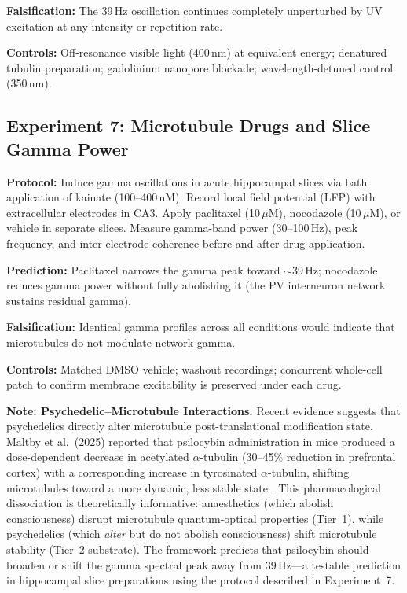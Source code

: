 \documentclass[10pt, a4paper, twocolumn]{article}
\begin{document}
\textbf{Falsification:} The 39\,Hz oscillation continues completely
unperturbed by UV excitation at any intensity or repetition rate.

\textbf{Controls:} Off-resonance visible light (400\,nm) at equivalent
energy; denatured tubulin preparation; gadolinium nanopore blockade;
wavelength-detuned control (350\,nm).

\subsection{Experiment 7: Microtubule Drugs and Slice Gamma Power}

\textbf{Protocol:} Induce gamma oscillations in acute hippocampal
slices via bath application of kainate (100--400\,nM). Record local
field potential (LFP) with extracellular electrodes in CA3. Apply
paclitaxel (10\,$\mu$M), nocodazole (10\,$\mu$M), or vehicle in
separate slices. Measure gamma-band power (30--100\,Hz), peak
frequency, and inter-electrode coherence before and after drug
application.

\textbf{Prediction:} Paclitaxel narrows the gamma peak toward
$\sim$39\,Hz; nocodazole reduces gamma power without fully abolishing
it (the PV interneuron network sustains residual gamma).

\textbf{Falsification:} Identical gamma profiles across all
conditions would indicate that microtubules do not modulate network
gamma.

\textbf{Controls:} Matched DMSO vehicle; washout recordings; concurrent
whole-cell patch to confirm membrane excitability is preserved under
each drug.

\textbf{Note: Psychedelic--Microtubule Interactions.}
Recent evidence suggests that psychedelics directly alter
microtubule post-translational modification state. Maltby
et al.\ (2025) reported that psilocybin administration in mice
produced a dose-dependent decrease in acetylated
$\alpha$-tubulin (30--45\% reduction in prefrontal cortex)
with a corresponding increase in tyrosinated
$\alpha$-tubulin, shifting microtubules toward a more
dynamic, less stable state \cite{maltby2025psilocybin}.
This pharmacological dissociation is theoretically
informative: anaesthetics (which abolish consciousness)
disrupt microtubule quantum-optical properties (Tier~1),
while psychedelics (which \emph{alter} but do not abolish
consciousness) shift microtubule stability (Tier~2
substrate). The framework predicts that psilocybin should
broaden or shift the gamma spectral peak away from
39\,Hz---a testable prediction in hippocampal slice
preparations using the protocol described in Experiment~7.
\end{document}

